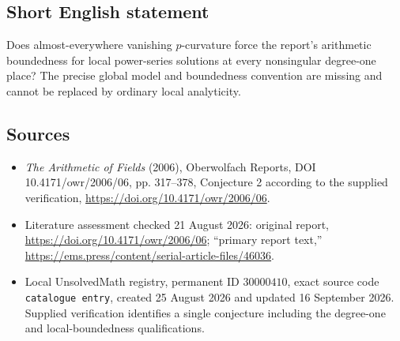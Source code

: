 \documentclass[11pt]{article}
\begin{document}
\subsection{Short English statement}
Does almost-everywhere vanishing $p$-curvature force the report's arithmetic boundedness for local power-series solutions at every nonsingular degree-one place? The precise global model and boundedness convention are missing and cannot be replaced by ordinary local analyticity.
\subsection{Sources}
\begin{itemize}
\item \emph{The Arithmetic of Fields} (2006), Oberwolfach Reports, DOI 10.4171/owr/2006/06, pp. 317--378, Conjecture 2 according to the supplied verification, \url{https://doi.org/10.4171/owr/2006/06}.
\item Literature assessment checked 21 August 2026: original report, \url{https://doi.org/10.4171/owr/2006/06}; ``primary report text,'' \url{https://ems.press/content/serial-article-files/46036}.
\item Local UnsolvedMath registry, permanent ID $30000410$, exact source code \texttt{catalogue entry}, created 25 August 2026 and updated 16 September 2026. Supplied verification identifies a single conjecture including the degree-one and local-boundedness qualifications.
\end{itemize}
\end{document}
